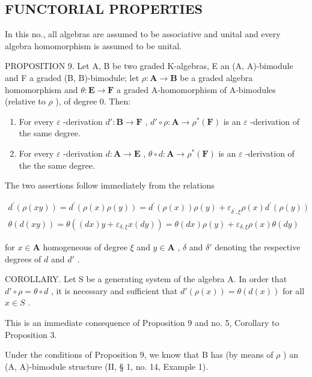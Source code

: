 \subsection{FUNCTORIAL PROPERTIES}

In this no., all algebras are assumed to be associative and unital and every algebra homomorphism is assumed to be unital.

PROPOSITION 9. Let A, B be two graded K-algebras, E an (A, A)-bimodule and F a graded (B, B)-bimodule; let \(\rho: \mathbf{A} \to \mathbf{B}\) be a graded algebra homomorphism and \(\theta: \mathbf{E} \to \mathbf{F}\) a graded A-homomorphism of A-bimodules (relative to \(\rho\) ), of degree 0. Then:

\begin{enumerate}
\def\labelenumi{(\roman{enumi})}
\item
  For every \(\varepsilon\) -derivation \(d':\mathbf{B}\to\mathbf{F}\) , \(d'\circ\rho:\mathbf{A}\to\rho^{*}(\mathbf{F})\) is an \(\varepsilon\) -derivation of the same degree.
\item
  For every \(\varepsilon\) -derivation \(d: \mathbf{A} \to \mathbf{E}\) , \(\theta \circ d: \mathbf{A} \to \rho^{*}(\mathbf{F})\) is an \(\varepsilon\) -derivation of the the same degree.
\end{enumerate}

The two assertions follow immediately from the relations

\[
\begin{array}{l} d ^ {\prime} (\rho (x y)) = d ^ {\prime} (\rho (x) \rho (y)) = d ^ {\prime} (\rho (x)) \rho (y) + \varepsilon_ {\delta ^ {\prime}, \xi} \rho (x) d ^ {\prime} (\rho (y)) \\ \theta (d (x y)) = \theta ((d x) y + \varepsilon_ {\delta, \xi} x (d y)) = \theta (d x) \rho (y) + \varepsilon_ {\delta, \xi} \rho (x) \theta (d y) \end{array}
\]

for \(x \in \mathbf{A}\) homogeneous of degree \(\xi\) and \(y \in \mathbf{A}\) , \(\delta\) and \(\delta'\) denoting the respective degrees of \(d\) and \(d'\) .

COROLLARY. Let S be a generating system of the algebra A. In order that \(d' \circ \rho = \theta \circ d\) , it is necessary and sufficient that \(d'(\rho(x)) = \theta(d(x))\) for all \(x \in S\) .

This is an immediate consequence of Proposition 9 and no. 5, Corollary to Proposition 3.

Under the conditions of Proposition 9, we know that B has (by means of \(\rho\) ) an (A, A)-bimodule structure (II, § 1, no. 14, Example 1).

